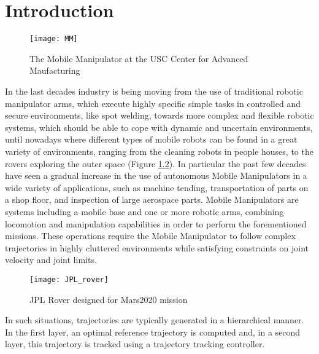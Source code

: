 \chapter{Introduction}
\label{chapter1}
\begin{figure}
	\centering
	\texttt{[image: MM]}
	\caption{The Mobile Manipulator at the USC Center for Advanced Maufacturing}
	\label{fig:MM}
\end{figure}
In the last decades industry is being moving from the use of traditional robotic manipulator arms, which execute highly specific simple tasks in controlled and secure environments, like spot welding, towards more complex and flexible robotic systems, which should be able to cope with dynamic and uncertain environments, until nowadays where different types of mobile robots can be found in a great variety of environments, ranging from the cleaning robots in people houses, to the rovers exploring the outer space (Figure \ref{JPL_rover}). In particular the past few decades have seen a gradual increase in the use of autonomous Mobile Manipulators in a wide variety of applications, such as machine tending, transportation of parts on a shop floor, and inspection of large aerospace parts. Mobile Manipulators are systems including a mobile base and one or more robotic arms, combining locomotion and manipulation capabilities in order to perform the forementioned missions. These operations require the Mobile Manipulator to follow complex trajectories in highly cluttered environments while satisfying constraints on joint velocity and joint limits.
\begin{figure}[t]
	\centering
	\texttt{[image: JPL\_rover]}
	\caption{JPL Rover designed for Mars2020 mission}
	\label{JPL_rover}
\end{figure}
In such situations, trajectories are typically generated in a hierarchical manner. In the first layer, an optimal reference trajectory is computed and, in a second layer, this trajectory is tracked using a trajectory tracking controller.\\
